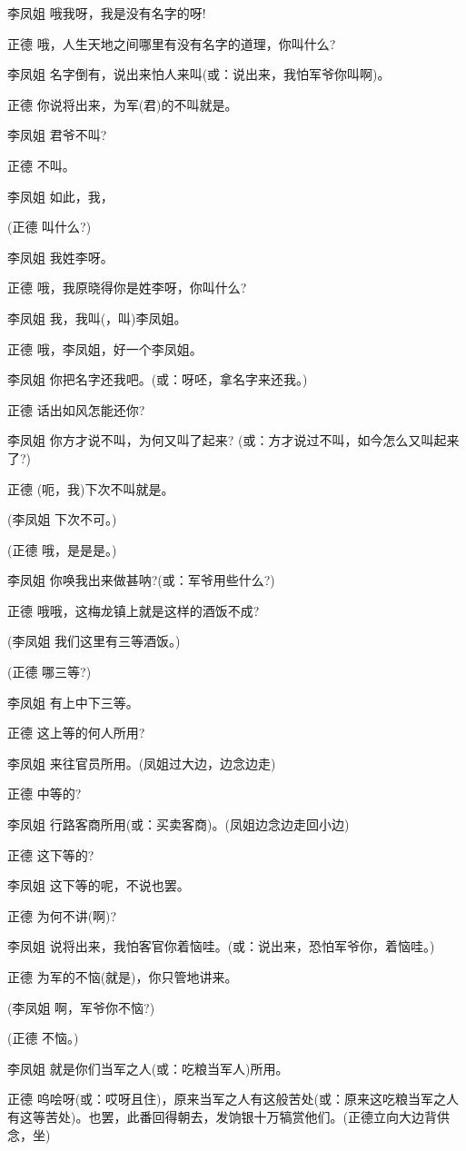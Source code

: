 李凤姐 哦我呀，我是没有名字的呀!

正德 哦，人生天地之间哪里有没有名字的道理，你叫什么?

李凤姐 名字倒有，说出来怕人来叫(或：说出来，我怕军爷你叫啊)。

正德 你说将出来，为军(君)的不叫就是。

李凤姐 君爷不叫?

正德 不叫。

李凤姐 如此，我，

(正德 叫什么?)

李凤姐 我姓李呀。

正德 哦，我原晓得你是姓李呀，你叫什么?

李凤姐 我，我叫(，叫)李凤姐。

正德 哦，李凤姐，好一个李凤姐。

李凤姐 你把名字还我吧。(或：呀呸，拿名字来还我。)

正德 话出如风怎能还你?

李凤姐 你方才说不叫，为何又叫了起来?
(或：方才说过不叫，如今怎么又叫起来了?)

正德 (呃，我)下次不叫就是。

(李凤姐 下次不可。)

(正德 哦，是是是。)

李凤姐 你唤我出来做甚呐?(或：军爷用些什么?)

正德 哦哦，这梅龙镇上就是这样的酒饭不成?

(李凤姐 我们这里有三等酒饭。)

(正德 哪三等?)

李凤姐 有上中下三等。

正德 这上等的何人所用?

李凤姐 来往官员所用。(凤姐过大边，边念边走)

正德 中等的?

李凤姐 行路客商所用(或：买卖客商)。(凤姐边念边走回小边)

正德 这下等的?

李凤姐 这下等的呢，不说也罢。

正德 为何不讲(啊)?

李凤姐 说将出来，我怕客官你着恼哇。(或：说出来，恐怕军爷你，着恼哇。)

正德 为军的不恼(就是)，你只管地讲来。

(李凤姐 啊，军爷你不恼?)

(正德 不恼。)

李凤姐 就是你们当军之人(或：吃粮当军人)所用。

正德
呜哙呀(或：哎呀且住)，原来当军之人有这般苦处(或：原来这吃粮当军之人有这等苦处)。也罢，此番回得朝去，发饷银十万犒赏他们。(正德立向大边背供念，坐)

